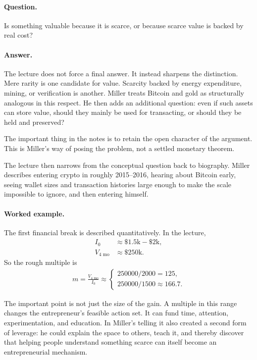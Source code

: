 \paragraph{Question.} Is something valuable because it is scarce, or because scarce value is backed by real cost?

\paragraph{Answer.} The lecture does not force a final answer. It instead sharpens the distinction. Mere rarity is one candidate for value. Scarcity backed by energy expenditure, mining, or verification is another. Miller treats Bitcoin and gold as structurally analogous in this respect. He then adds an additional question: even if such assets can store value, should they mainly be used for transacting, or should they be held and preserved?

The important thing in the notes is to retain the open character of the argument. This is Miller's way of posing the problem, not a settled monetary theorem.

The lecture then narrows from the conceptual question back to biography. Miller describes entering crypto in roughly 2015--2016, hearing about Bitcoin early, seeing wallet sizes and transaction histories large enough to make the scale impossible to ignore, and then entering himself.

\paragraph{Worked example.} The first financial break is described quantitatively. In the lecture,
\begin{align}
I_0 &\approx \$1.5\text{k}-\$2\text{k},\\
V_{4\text{ mo}} &\approx \$250\text{k}.
\end{align}
So the rough multiple is
\begin{align}
m=\frac{V_{4\text{ mo}}}{I_0}
\approx
\begin{cases}
250000/2000 = 125,\\
250000/1500 \approx 166.7.
\end{cases}
\end{align}

The important point is not just the size of the gain. A multiple in this range changes the entrepreneur's feasible action set. It can fund time, attention, experimentation, and education. In Miller's telling it also created a second form of leverage: he could explain the space to others, teach it, and thereby discover that helping people understand something scarce can itself become an entrepreneurial mechanism.

